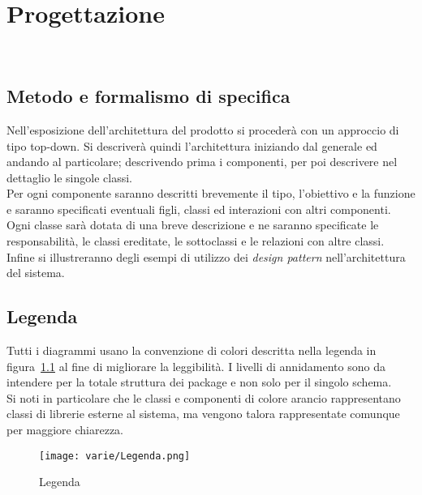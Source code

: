 
\chapter{Progettazione}
\label{cap:progettazione-codifica}

\\


\section{Metodo e formalismo di specifica}
Nell'esposizione dell'architettura del prodotto si procederà con un approccio di tipo top-down.  Si descriverà quindi l'architettura iniziando dal generale ed andando al particolare; descrivendo prima i componenti, per poi descrivere nel dettaglio le singole classi.\\
Per ogni componente saranno descritti brevemente il tipo, l'obiettivo e la funzione e saranno specificati
eventuali figli, classi ed interazioni con altri componenti. Ogni classe sarà dotata di una breve descrizione e
ne saranno specificate le responsabilità, le classi ereditate, le sottoclassi e le relazioni con altre classi.\\
Infine si illustreranno degli esempi di utilizzo dei \emph{design pattern} nell'architettura del sistema.

\section{Legenda}
Tutti i diagrammi usano la convenzione di colori descritta nella legenda in figura~\ref{fig:legenda} al fine di migliorare la leggibilità. I livelli di annidamento sono da intendere per la totale struttura dei package e non solo per il singolo schema.\\
Si noti in particolare che le classi e componenti di colore arancio rappresentano classi di librerie esterne al sistema, ma vengono talora rappresentate comunque per maggiore chiarezza.
\begin{figure}[H] 
    \centering 
    \texttt{[image: varie/Legenda.png]} 
    \caption{Legenda}\label{fig:legenda}
\end{figure}


